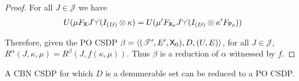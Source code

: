 \begin{proof}
For all $J\in \mathscr{J}$ we have
\begin{align}
    U(\mu F_{\RV{X}} J\splitter{0.13}(I_{(D)}\otimes \kappa) &= U(\mu' F_{\RV{X}_0} J\splitter{0.13}(I_{(D)}\otimes \kappa' F_{\RV{P}_0}))\\
\end{align}

Therefore, given the PO CSDP $\beta=\langle (\mathscr{T}',E',\mathsf{X}_0),D,(U,E) \rangle$, for all $J\in \mathscr{J}$, $R^\alpha(J,\kappa,\mu)=R^\beta(J,f(\kappa,\mu))$. Thus $\beta$  is a reduction of $\alpha$ witnessed by $f$.
\end{proof}

\begin{corollary}
A CBN CSDP for which $D$ is a denumerable set can be reduced to a PO CSDP.
\end{corollary}

